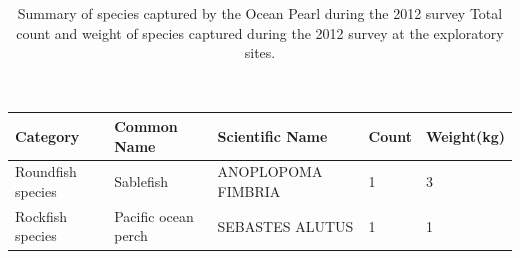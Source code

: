 \documentclass[12pt]{article}\usepackage[]{graphicx}\usepackage[]{color}
\begin{document}
\begin{table}[!h]

\caption{\label{tab:table5}Summary of species captured by the Ocean Pearl during the 2012 survey Total count and weight of species captured during the 2012 survey at the exploratory sites.\\
\hspace*{0.333em}\\
\hspace*{0.333em}\\}
\fontsize{9}{11}\selectfont
\begin{tabular}[t]{lllll}
\toprule
\textbf{Category} & \textbf{Common Name} & \textbf{Scientific Name} & \textbf{Count} & \textbf{Weight(kg)}\\
\midrule
Roundfish species & Sablefish & ANOPLOPOMA FIMBRIA & 1 & 3\\
Rockfish species & Pacific ocean perch & SEBASTES ALUTUS & 1 & 1\\
\bottomrule
\end{tabular}
\end{table}
~\\
\hspace*{0.333em}\\
\end{document}
